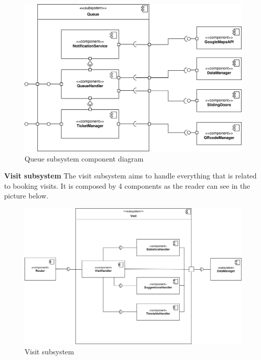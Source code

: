 \documentclass[]{article}
\begin{document}
	
	\begin{figure}[H]
			\centering
			\includegraphics[scale=0.9]{ComponentView/queueComponent.png}
			\caption{Queue subsystem component diagram}
			\label{fig:Queuediagram}
		\end{figure}
		\bigskip\bigskip
		
	\newpage
	\noindent
	\textbf{Visit subsystem}
	\medskip \newline
	The visit subsystem aims to handle everything that is related to booking visits. It is composed by 4 components as the reader can see in the picture below. 
	\bigskip
	
	\begin{figure}[H]
		\centering
		\includegraphics[scale=0.73]{ComponentView/VisitComponent}
		\caption{Visit subsystem}
		\label{fig:visitSubsystem}
	\end{figure}
	
\end{document}
